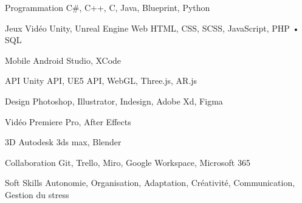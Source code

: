 

\begin{cvskills}


  \cvskill
    {Programmation} %
    {C\#, C++, C, Java, Blueprint, Python} %

    \cvskill
    {Jeux Vidéo} %
    {Unity, Unreal Engine}
  \cvskill
    {Web} %
    {HTML, CSS, SCSS, JavaScript, PHP • SQL} %

    \cvskill
    {Mobile} %
    {Android Studio, XCode} %
    
    \cvskill
    {API} %
    {Unity API, UE5 API, WebGL, Three.js, AR.js } %

    \cvskill
    {Design} %
    {Photoshop, Illustrator, Indesign, Adobe Xd, Figma} %

    \cvskill
    {Vidéo} %
    {Premiere Pro, After Effects} %

    \cvskill
    {3D} %
    {Autodesk 3ds max, Blender} %

    \cvskill
    {Collaboration} %
    {Git, Trello, Miro, Google Workspace, Microsoft 365} %

    
    
  \cvskill
    {Soft Skills} %
    {Autonomie, Organisation, Adaptation, Créativité, Communication, Gestion du stress} %

\end{cvskills}
